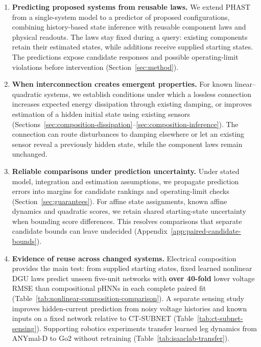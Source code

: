 \begin{enumerate}
\item \textbf{Predicting proposed systems from reusable laws.}
We extend PHAST from a single-system model to a predictor of proposed configurations, combining history-based state inference with reusable component laws and physical readouts.
The laws stay fixed during a query: existing components retain their estimated states, while additions receive supplied starting states.
The predictions expose candidate responses and possible operating-limit violations before intervention (Section~\ref{sec:method}).

\item \textbf{When interconnection creates emergent properties.}
For known linear--quadratic systems, we establish conditions under which a lossless connection increases expected energy dissipation through existing damping, or improves estimation of a hidden initial state using existing sensors (Sections~\ref{sec:composition-dissipation}--\ref{sec:composition-inference}).
The connection can route disturbances to damping elsewhere or let an existing sensor reveal a previously hidden state, while the component laws remain unchanged.

\item \textbf{Reliable comparisons under prediction uncertainty.}
Under stated model, integration and estimation assumptions, we propagate prediction errors into margins for candidate rankings and operating-limit checks (Section~\ref{sec:guarantees}).
For affine state assignments, known affine dynamics and quadratic scores, we retain shared starting-state uncertainty when bounding score differences.
This resolves comparisons that separate candidate bounds can leave undecided (Appendix~\ref{app:paired-candidate-bounds}).

\item \textbf{Evidence of reuse across changed systems.}
Electrical composition provides the main test: from supplied starting states, fixed learned nonlinear DGU laws predict unseen five-unit networks with \textbf{over 40-fold} lower voltage RMSE than compositional pHNNs in each complete paired fit (Table~\ref{tab:nonlinear-composition-comparison}).
A separate sensing study improves hidden-current prediction from noisy voltage histories and known inputs on a fixed network relative to CT-SUBNET (Table~\ref{tab:ct-subnet-sensing}).
Supporting robotics experiments transfer learned leg dynamics from ANYmal-D to Go2 without retraining (Table~\ref{tab:isaaclab-transfer}).
\par{}
\end{enumerate}

